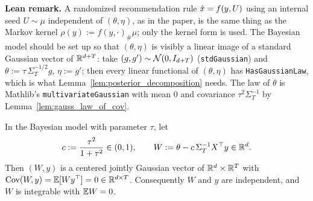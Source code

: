 \textbf{Lean remark.} A randomized recommendation rule $\hat{x} = f(y, U)$ using an internal
seed $U \sim \mu$ independent of $(\theta, \eta)$, as in the paper, is the same thing as the
Markov kernel $\rho(y) := f(y,\cdot)_\#\mu$; only the kernel form is used. The Bayesian model
should be set up so that $(\theta,\eta)$ is visibly a linear image of a standard Gaussian
vector of $\mathbb{R}^{d+T}$: take $(g, g') \sim \mathcal{N}(0, I_{d+T})$ (\texttt{stdGaussian}) and
$\theta := \tau\,\Sigma_T^{-1/2} g$, $\eta := g'$; then every linear functional of
$(\theta,\eta)$ has \texttt{HasGaussianLaw}, which is what
Lemma~\ref{lem:posterior_decomposition} needs. The law of $\theta$ is Mathlib's
\texttt{multivariateGaussian} with mean $0$ and covariance $\tau^2\Sigma_T^{-1}$ by Lemma~\ref{lem:gauss_law_of_cov}.

\begin{lemma}\label{lem:posterior_decomposition}
\leanok
{}
In the Bayesian model with parameter $\tau$, let
\[
  c := \frac{\tau^2}{1+\tau^2} \in (0,1), \qquad
  W := \theta - c\,\Sigma_T^{-1}X^\top y \in \mathbb{R}^d .
\]
Then $(W, y)$ is a centered jointly Gaussian vector of $\mathbb{R}^d \times \mathbb{R}^T$ with
$\mathrm{Cov}(W, y) = \mathbb{E}[W y^\top] = 0 \in \mathbb{R}^{d \times T}$. Consequently $W$ and $y$ are
independent, and $W$ is integrable with $\mathbb{E} W = 0$.
\end{lemma}

